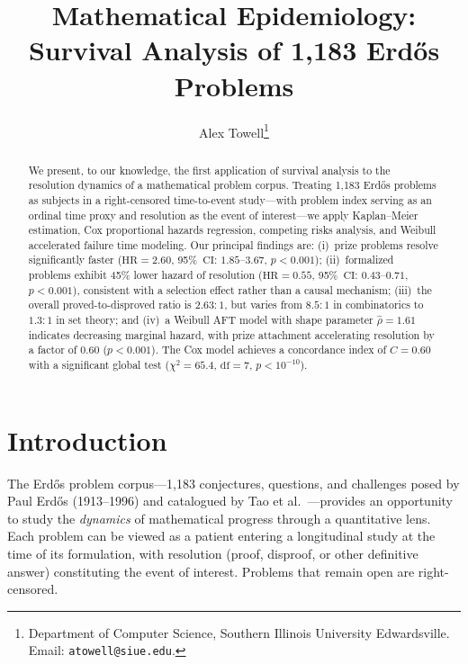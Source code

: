 \documentclass[11pt]{article}
\newcommand{\HR}{\mathrm{HR}}
\newcommand{\CI}{\mathrm{CI}}
\begin{document}
\title{Mathematical Epidemiology:\\
Survival Analysis of 1,183 Erd\H{o}s Problems}

\author{
  Alex Towell\thanks{Department of Computer Science,
  Southern Illinois University Edwardsville.
  Email: \texttt{atowell@siue.edu}.}
}

\date{}
\maketitle

\begin{abstract}
We present, to our knowledge, the first application of survival analysis
to the resolution dynamics of a mathematical problem corpus.
Treating 1,183 Erd\H{o}s problems as subjects in a right-censored
time-to-event study---with problem index serving as an ordinal time
proxy and resolution as the event of interest---we apply
Kaplan--Meier estimation, Cox proportional hazards regression,
competing risks analysis, and Weibull accelerated failure time
modeling.
Our principal findings are:
(i)~prize problems resolve significantly faster
($\HR = 2.60$, 95\%~$\CI$: $1.85$--$3.67$, $p < 0.001$);
(ii)~formalized problems exhibit 45\% lower hazard of resolution
($\HR = 0.55$, 95\%~$\CI$: $0.43$--$0.71$, $p < 0.001$),
consistent with a selection effect rather than a causal mechanism;
(iii)~the overall proved-to-disproved ratio is $2.63{:}1$,
but varies from $8.5{:}1$ in combinatorics to $1.3{:}1$ in set theory;
and (iv)~a Weibull AFT model with shape parameter $\hat\rho = 1.61$
indicates decreasing marginal hazard, with prize attachment
accelerating resolution by a factor of $0.60$ ($p < 0.001$).
The Cox model achieves a concordance index of $C = 0.60$ with a
significant global test ($\chi^2 = 65.4$, $\text{df} = 7$,
$p < 10^{-10}$).
\end{abstract}


\section{Introduction}

The Erd\H{o}s problem corpus---1,183 conjectures, questions, and
challenges posed by Paul Erd\H{o}s (1913--1996) and catalogued by
Tao et al.~\cite{erdosproblems}---provides an opportunity
to study the \emph{dynamics} of mathematical progress through a
quantitative lens. Each problem can be viewed as a patient entering
a longitudinal study at the time of its formulation, with resolution
(proof, disproof, or other definitive answer) constituting the event
of interest. Problems that remain open are right-censored.
\end{document}
